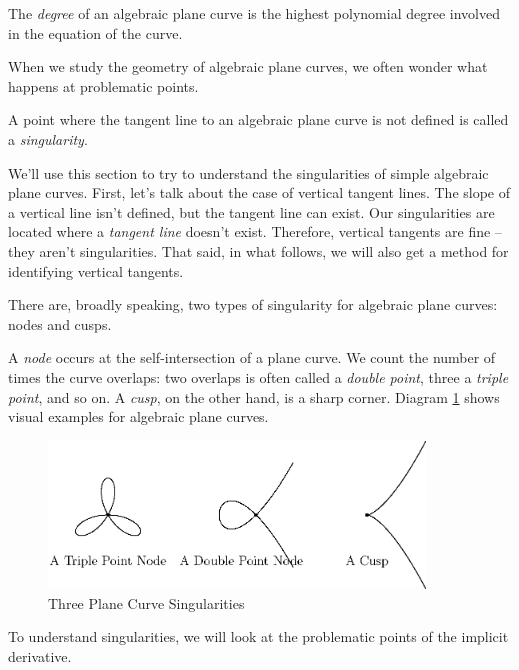 \documentclass[fleqn]{report}
\begin{document}
\begin{defn}
The \emph{degree} of an algebraic plane curve is the highest
polynomial degree involved in the equation of the curve.
\end{defn}

When we study the geometry of algebraic plane curves, we often 
wonder what happens at problematic points.

\begin{defn}
A point where the tangent line to an algebraic plane curve is
not defined is called a \emph{singularity}. 
\end{defn}

We'll use this section to try to understand the singularities
of simple algebraic plane curves. First, let's talk about the
case of vertical tangent lines. The slope of a vertical line
isn't defined, but the tangent line can exist. Our
singularities are located where a \emph{tangent line} doesn't
exist. Therefore, vertical tangents are fine -- they aren't
singularities. That said, in what follows, we will also get a
method for identifying vertical tangents.

There are, broadly speaking, two types of singularity for
algebraic plane curves: nodes and cusps. 

\begin{defn} 
A \emph{node} occurs at the self-intersection of a plane
curve. We count the number of times the curve overlaps: two
overlaps is often called a \emph{double point}, three a
\emph{triple point}, and so on. A \emph{cusp}, on the other
hand, is a sharp corner. Diagram \ref{figure-singularities} shows
visual examples for algebraic plane curves.
\end{defn}

\begin{figure}[ht]
\centering
\includegraphics[width=10cm]{figure04.eps}
\caption{Three Plane Curve Singularities}
\label{figure-singularities}
\end{figure}

To understand singularities, we will look at the problematic
points of the implicit derivative. 
\end{document}
